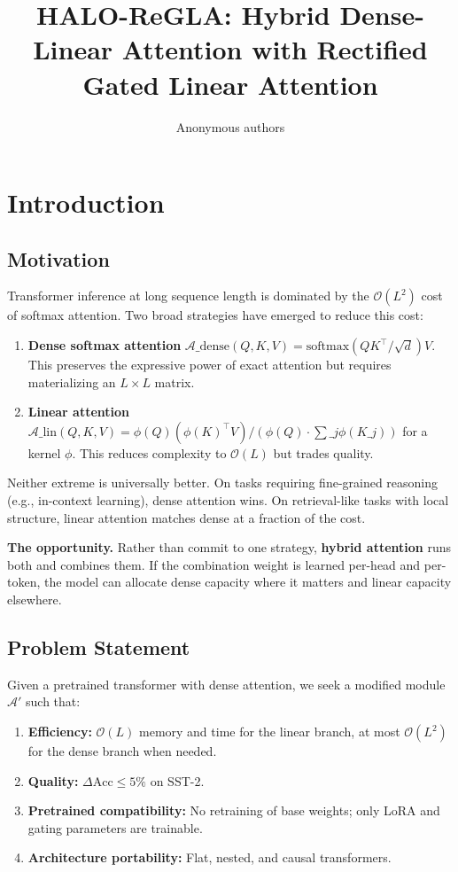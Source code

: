 \title{\textbf{HALO-ReGLA: Hybrid Dense-Linear Attention with Rectified Gated Linear Attention}}

\author{Anonymous authors}



\section{Introduction}

\subsection{Motivation}

Transformer inference at long sequence length is dominated by the 
$\mathcal{O}(L^2)$ cost of softmax attention. Two broad strategies have 
emerged to reduce this cost:

\begin{enumerate}
\item \textbf{Dense softmax attention} $\mathcal{A}\_\text{dense}(Q, K, V) =
  \text{softmax}(QK^\top / \sqrt{d}) V$. This preserves the expressive power
  of exact attention but requires materializing an $L \times L$ matrix.

\item \textbf{Linear attention} $\mathcal{A}\_\text{lin}(Q, K, V) =
  \phi(Q) (\phi(K)^\top V) / (\phi(Q) \cdot \sum\_j \phi(K\_j))$ for a kernel
  $\phi$. This reduces complexity to $\mathcal{O}(L)$ but trades quality.

\end{enumerate}
Neither extreme is universally better. On tasks requiring fine-grained 
reasoning (e.g., in-context learning), dense attention wins. On retrieval-like 
tasks with local structure, linear attention matches dense at a fraction of 
the cost.

\textbf{The opportunity.} Rather than commit to one strategy, \textbf{hybrid attention} 
runs both and combines them. If the combination weight is learned per-head 
and per-token, the model can allocate dense capacity where it matters and 
linear capacity elsewhere.

\subsection{Problem Statement}

Given a pretrained transformer with dense attention, we seek a modified 
module $\mathcal{A}'$ such that:

\begin{enumerate}
\item \textbf{Efficiency:} $\mathcal{O}(L)$ memory and time for the linear branch,
  at most $\mathcal{O}(L^2)$ for the dense branch when needed.
\item \textbf{Quality:} $\Delta\text{Acc} \leq 5\%$ on SST-2.
\item \textbf{Pretrained compatibility:} No retraining of base weights; only LoRA
  and gating parameters are trainable.
\item \textbf{Architecture portability:} Flat, nested, and causal transformers.

\end{enumerate}
